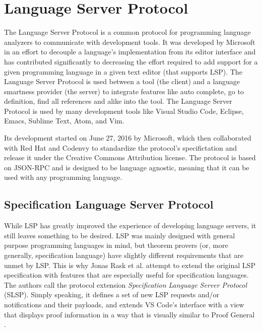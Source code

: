 \section{Language Server Protocol}

The Language Server Protocol is a common protocol for programming language analyzers to communicate with development tools. It was developed by Microsoft in an effort to decouple a language's implementation from its editor interface \cite{Buender2019} and has contributed significantly to decreasing the effort required to add support for a given programming language in a given text editor (that supports LSP). The Language Server Protocol is used between a tool (the client) and a language smartness provider (the server) to integrate features like auto complete, go to definition, find all references and alike into the tool. The Language Server Protocol is used by many development tools like Visual Studio Code, Eclipse, Emacs, Sublime Text, Atom, and Vim.

Its development started on June 27, 2016 by Microsoft, which then collaborated with Red Hat and Codenvy to standardize the protocol's specifictation and release it under the Creative Commons Attribution license.
The protocol is based on JSON-RPC and is designed to be language agnostic, meaning that it can be used with any programming language.


\subsection{Specification Language Server Protocol}

While LSP has greatly improved the experience of developing language servers,
it still leaves something to be desired.
LSP was mainly designed with general purpose programming languages in mind,
but theorem provers (or, more generally, specification language) have slightly
different requirements that are unmet by LSP.
This is why Jonas Rask et al. \cite{JonasKjaerRask2021} attempt to extend the original LSP
specification with features that are especially useful for specification languages.
The authors call the protocol extension \textit{Specification Language Server Protocol} (SLSP).
Simply speaking, it defines a set of new LSP requests and/or notifications and
their payloads, and extends VS Code's interface with a view that displays proof
information in a way that is visually similar to Proof General \cite{Aspinall2000}.

